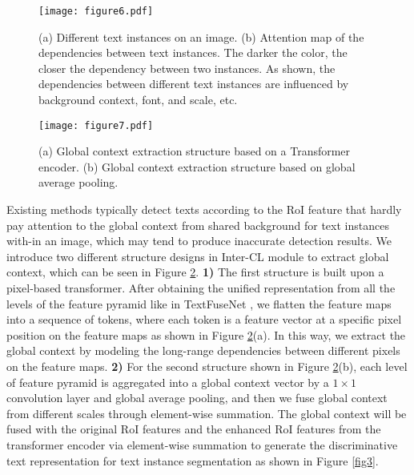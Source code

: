  \begin{figure}[ht]
  \centering
  \texttt{[image: figure6.pdf]}
  \caption{(a) Different text instances on an image. (b) Attention map of the dependencies between text instances. The darker the color, the closer the dependency between two instances. As shown, the dependencies between different text instances are influenced by background context, font, and scale, etc.}
  \label{fig6}
\end{figure}

\begin{figure}[t]
  \centering
  \texttt{[image: figure7.pdf]}
  \caption{(a) Global context extraction structure based on a Transformer encoder. (b) Global context extraction structure based on global average pooling.}
  \label{fig7}
\end{figure}

Existing methods typically detect texts according to the RoI feature that hardly pay attention to the global context from shared background for text instances with-in an image, which may tend to produce inaccurate detection results. We introduce two different structure designs in Inter-CL module to extract global context, which can be seen in Figure \ref{fig7}. \textbf{1)} The first structure is built upon a pixel-based transformer. After obtaining the unified representation from all the levels of the feature pyramid like in TextFuseNet \citep{textfusenet}, we flatten the feature maps into a sequence of tokens, where each token is a feature vector at a specific pixel position on the feature maps as shown in Figure \ref{fig7}(a). In this way, we extract the global context by modeling the long-range dependencies between different pixels on the feature maps. \textbf{2)} For the second structure shown in Figure \ref{fig7}(b), each level of feature pyramid is aggregated into a global context vector by a $1 \times 1$ convolution layer and global average pooling, and then we fuse global context from different scales through element-wise summation. The global context will be fused with the original RoI features and the enhanced RoI features from the transformer encoder via element-wise summation to generate the discriminative text representation for text instance segmentation as shown in Figure \ref{fig3}.

